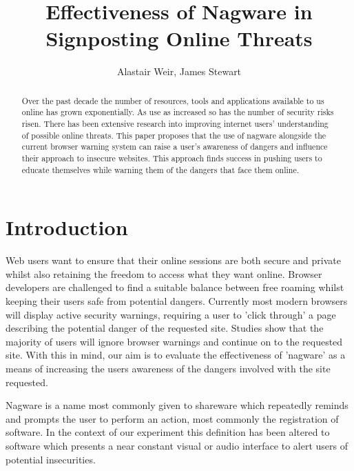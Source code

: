\documentclass{mpaper}
\begin{document}
\title{Effectiveness of Nagware in Signposting Online Threats}
\author{Alastair Weir, James Stewart}

\maketitle

\begin{abstract}


Over the past decade the number of resources, tools and applications available to us online has grown exponentially. As use as increased so has the number of security risks risen. There has been extensive research into improving internet users' understanding of possible online threats. This paper proposes that the use of nagware alongside the current browser warning system can raise a user's awareness of dangers and influence their approach to insecure websites. This approach finds success in pushing users to educate themselves while warning them of the dangers that face them online.
\end{abstract}

\section{Introduction}
Web users want to ensure that their online sessions are both secure and private whilst also retaining the freedom to access what they want online. Browser developers are challenged to find a suitable balance between free roaming whilst keeping their users safe from potential dangers. Currently most modern browsers will display active security warnings, requiring a user to 'click through' a page describing the potential danger of the requested site. Studies show\cite{WarningLand} that the majority of users will ignore browser warnings and continue on to the requested site. With this in mind, our aim is to evaluate the effectiveness of 'nagware' as a means of increasing the users awareness of the dangers involved with the site requested.

Nagware is a name most commonly given to shareware which repeatedly reminds and prompts the user to perform an action, most commonly the registration of software. In the context of our experiment this definition has been altered to software which presents a near constant visual or audio interface to alert users of potential insecurities.
\end{document}

